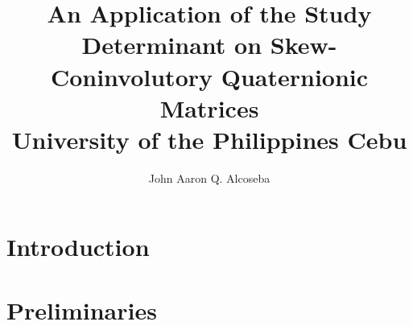 \documentclass[12pt]{report}
\title{
	{An Application of the Study Determinant on Skew-Coninvolutory
	 Quaternionic Matrices}\\
	{\large University of the Philippines Cebu}\\
}
\author{John Aaron Q. Alcoseba}
\theoremstyle{definition}
\theoremstyle{theorem}
\theoremstyle{remark}
\begin{document}

	\chapter{Introduction}
	

	\chapter{Preliminaries}
	



	
	
\end{document}
